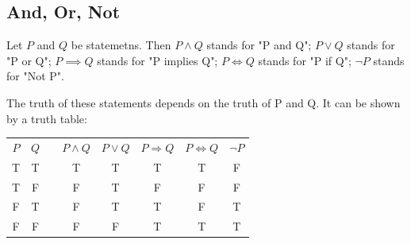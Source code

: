 \subsection{And, Or, Not}
Let $P$ and $Q$ be statemetns.
Then $P \wedge Q$ stands for "P and Q";
$P \vee Q$ stands for "P or Q";
$P \implies Q$ stands for "P implies Q";
$P \iff Q$ stands for "P if Q";
$\neg P$ stands for "Not P". 

The truth of these statements depends on the truth of P and Q. It can be shown by a truth table:
\begin{center}
  \begin{tabular}{cccccccc}
    $P$ & $Q$ &\quad &$P\wedge Q$ & $P\vee Q$ & $P\Rightarrow Q$ & $P\Leftrightarrow Q$ & $\neg P$ \\
    T & T & & T & T & T & T & F\\
    T & F & & F & T & F & F & F\\
    F & T & & F & T & T & F & T\\
    F & F & & F & F & T & T & T\\
  \end{tabular}
\end{center}

\newpage